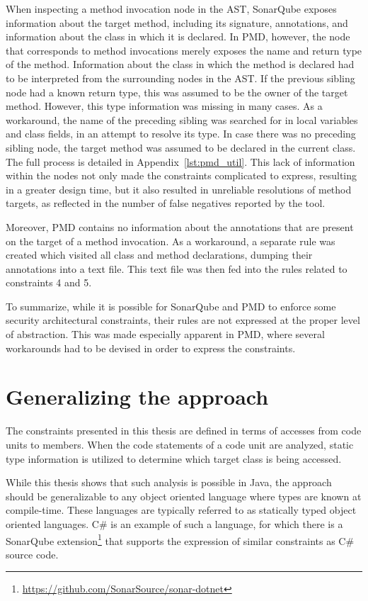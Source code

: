 When inspecting a method invocation node in the AST, SonarQube exposes information about the target method, including its signature, annotations, and information about the class in which it is declared. In PMD, however, the node that corresponds to method invocations merely exposes the name and return type of the method. Information about the class in which the method is declared had to be interpreted from the surrounding nodes in the AST. If the previous sibling node had a known return type, this was assumed to be the owner of the target method. However, this type information was missing in many cases. As a workaround, the name of the preceding sibling was searched for in local variables and class fields, in an attempt to resolve its type. In case there was no preceding sibling node, the target method was assumed to be declared in the current class. The full process is detailed in Appendix~\ref{lst:pmd_util}. This lack of information within the nodes not only made the constraints complicated to express, resulting in a greater design time, but it also resulted in unreliable resolutions of method targets, as reflected in the number of false negatives reported by the tool.

Moreover, PMD contains no information about the annotations that are present on the target of a method invocation. As a workaround, a separate rule was created which visited all class and method declarations, dumping their annotations into a text file. This text file was then fed into the rules related to constraints 4 and 5.

To summarize, while it is possible for SonarQube and PMD to enforce some security architectural constraints, their rules are not expressed at the proper level of abstraction. This was made especially apparent in PMD, where several workarounds had to be devised in order to express the constraints.


\section{Generalizing the approach}
The constraints presented in this thesis are defined in terms of accesses from code units to members. When the code statements of a code unit are analyzed, static type information is utilized to determine which target class is being accessed.

While this thesis shows that such analysis is possible in Java, the approach should be generalizable to any object oriented language where types are known at compile-time. These languages are typically referred to as statically typed object oriented languages. C\# is an example of such a language, for which there is a SonarQube extension\footnote{\url{https://github.com/SonarSource/sonar-dotnet}} that supports the expression of similar constraints as C\# source code.

